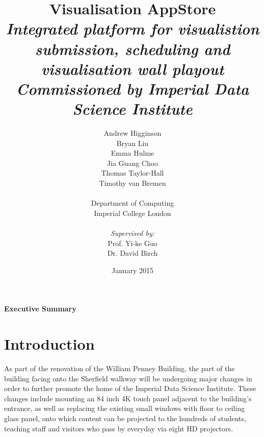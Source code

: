 \documentclass[a4paper, titlepage]{article}
\title{Visualisation AppStore \\ \vspace{10pt}
\textit{\large Integrated platform for visualistion submission, scheduling and visualisation wall playout} \\ \vspace*{-5pt}
\textit{\large Commissioned by Imperial Data Science Institute}}
\author{Andrew Higginson\\ Bryan Liu \\ Emma Hulme \\ Jia Guang Choo \\
        Thomas Taylor-Hall \\ Timothy van Bremen \\\\ 
        Department of Computing \\ Imperial College London \\\\ \textit{Supervised by:} \\
        Prof. Yi-ke Guo \\ Dr. David Birch}
\date{January 2015}
\begin{document}
\maketitle


\newpage
{}
\Large
\textbf{Executive Summary}

\normalsize





\newpage
\tableofcontents
\listoffigures
\listoftables


\newpage
{}
\section{Introduction}

As part of the renovation of the William Penney Building, the part of the building facing onto the Sherfield walkway will be undergoing major changes in order to further promote the home of the Imperial Data Science Institute. These changes include mounting an 84 inch 4K touch panel adjacent to the building's entrance, as well as replacing the existing small windows with floor to ceiling glass panel, onto which content can be projected to the hundreds of students, teaching staff and visitors who pass by everyday via eight HD projectors.
\end{document}
